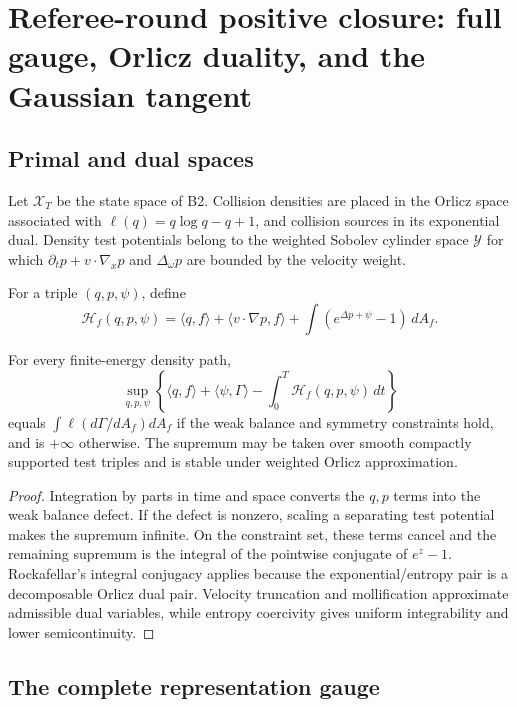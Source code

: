 \section{Referee-round positive closure: full gauge, Orlicz duality, and the Gaussian tangent}
\label{sec:rr2-b3}

\subsection{Primal and dual spaces}

Let \(\mathcal X_T\) be the state space of B2.  Collision densities are placed
in the Orlicz space associated with
\(\ell(q)=q\log q-q+1\), and collision sources in its exponential dual.
Density test potentials belong to the weighted Sobolev cylinder space
\(\mathcal Y\) for which
\(\partial_t p+v\cdot\nabla_xp\) and \(\Delta_\omega p\) are bounded by the
velocity weight.

For a triple \((q,p,\psi)\), define
\[
 \mathcal H_f(q,p,\psi)
 =
 \langle q,f\rangle+\langle v\cdot\nabla p,f\rangle
 +\int(e^{\Delta p+\psi}-1)\,dA_f .
\]

\begin{theorem}
\label{thm:rr2-b3-duality}
For every finite-energy density path,
\[
 \sup_{q,p,\psi}
 \left\{
 \langle q,f\rangle+
 \langle\psi,\Gamma\rangle-
 \int_0^T\mathcal H_f(q,p,\psi)\,dt
 \right\}
\]
equals \(\int\ell(d\Gamma/dA_f)dA_f\) if the weak balance and symmetry
constraints hold, and is \(+\infty\) otherwise.  The supremum may be taken
over smooth compactly supported test triples and is stable under weighted
Orlicz approximation.
\end{theorem}

\begin{proof}
Integration by parts in time and space converts the \(q,p\) terms into the
weak balance defect.  If the defect is nonzero, scaling a separating test
potential makes the supremum infinite.  On the constraint set, these terms
cancel and the remaining supremum is the integral of the pointwise conjugate
of \(e^z-1\).  Rockafellar's integral conjugacy applies because the
exponential/entropy pair is a decomposable Orlicz dual pair.  Velocity
truncation and mollification approximate admissible dual variables, while
entropy coercivity gives uniform integrability and lower semicontinuity.
\end{proof}

\subsection{The complete representation gauge}

